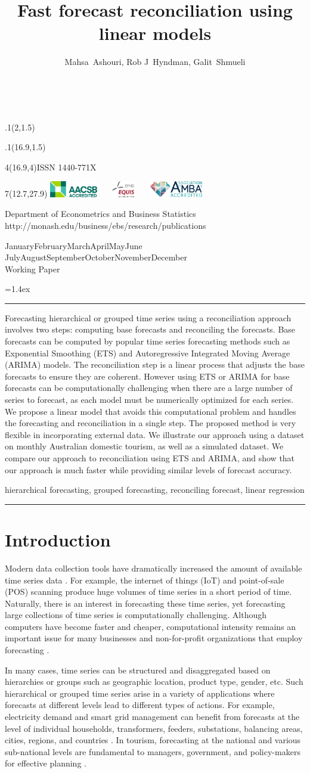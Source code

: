 \documentclass[11pt,a4paper,]{article}
\title{Fast forecast reconciliation using linear models}
\author{Mahsa~Ashouri, Rob J~Hyndman, Galit~Shmueli}
\date{\sf\Date~\Month~\Year}
\makeatletter
\def\Date{\number\day}
\def\Month{\ifcase\month\or
 January\or February\or March\or April\or May\or June\or
 July\or August\or September\or October\or November\or December\fi}
\def\Year{\number\year}
\def\showjel{{\large\textsf{\textbf{JEL classification:}}~\@jel}}
\def\cover{{\sffamily\setcounter{page}{0}
        \thispagestyle{empty}
        \placefig{2}{1.5}{width=5cm}{monash2}
        \placefig{16.9}{1.5}{width=2.1cm}{MBusSchool}
        \begin{textblock}{4}(16.9,4)ISSN 1440-771X\end{textblock}
        \begin{textblock}{7}(12.7,27.9)\hfill
        \includegraphics[height=0.7cm]{AACSB}~~~
        \includegraphics[height=0.7cm]{EQUIS}~~~
        \includegraphics[height=0.7cm]{AMBA}
        \end{textblock}
        \vspace*{2cm}
        \begin{center}\Large
        Department of Econometrics and Business Statistics\\[.5cm]
        \footnotesize http://monash.edu/business/ebs/research/publications
        \end{center}\vspace{2cm}
        \begin{center}
        \fbox{\parbox{14cm}{\begin{onehalfspace}\centering\Huge\vspace*{0.3cm}
                \textsf{\textbf{\expandafter{\@title}}}\vspace{1cm}\par
                \LARGE\@author\end{onehalfspace}
        }}
        \end{center}
        \vfill
                \begin{center}\Large
                \Month~\Year\\[1cm]
                Working Paper \@wp
        \end{center}\vspace*{2cm}}}
\def\pageone{{\sffamily\setstretch{1}%
        \thispagestyle{empty}%
        \vbox to \textheight{%
        \raggedright\baselineskip=1.2cm
     {\fontsize{24.88}{30}\sffamily\textbf{\expandafter{\@title}}}
        \vspace{2cm}\par
        \hspace{1cm}\parbox{14cm}{\sffamily\large\@addresses}\vspace{1cm}\vfill
        \hspace{1cm}{\large\Date~\Month~\Year}\\[1cm]
        \hspace{1cm}\showjel\vss}}}
\def\blindtitle{{\sffamily
     \thispagestyle{plain}\raggedright\baselineskip=1.2cm
     {\fontsize{24.88}{30}\sffamily\textbf{\expandafter{\@title}}}\vspace{1cm}\par
        }}
\def\titlepage{{\cover\newpage\pageone\newpage\blindtitle}}
\let\maketitle\titlepage
\newenvironment{keywords}{\par\vspace{0.5cm}\noindent{\sffamily\textbf{Keywords:}}}{\vspace{0.25cm}\par\hrule\vspace{0.5cm}\par}
\renewenvironment{abstract}{\begin{minipage}{\textwidth}\parskip=1.4ex\noindent
\hrule\vspace{0.1cm}\par{\sffamily\textbf{\abstractname}}\newline}
  {\end{minipage}}
\def\placefig#1#2#3#4{\begin{textblock}{.1}(#1,#2)\rlap{\texttt{[image: \#4]}}\end{textblock}}
\makeatother
\begin{document}
\maketitle
\begin{abstract}
Forecasting hierarchical or grouped time series using a reconciliation approach involves two steps: computing base forecasts and reconciling the forecasts. Base forecasts can be computed by popular time series forecasting methods such as Exponential Smoothing (ETS) and Autoregressive Integrated Moving Average (ARIMA) models. The reconciliation step is a linear process that adjusts the base forecasts to ensure they are coherent. However using ETS or ARIMA for base forecasts can be computationally challenging when there are a large number of series to forecast, as each model must be numerically optimized for each series. We propose a linear model that avoids this computational problem and handles the forecasting and reconciliation in a single step. The proposed method is very flexible in incorporating external data. We illustrate our approach using a dataset on monthly Australian domestic tourism, as well as a simulated dataset. We compare our approach to reconciliation using ETS and ARIMA, and show that our approach is much faster while providing similar levels of forecast accuracy.
\end{abstract}
\begin{keywords}
hierarchical forecasting, grouped forecasting, reconciling forecast, linear regression
\end{keywords}

\hypertarget{introduction}{%
\section{Introduction}\label{introduction}}

Modern data collection tools have dramatically increased the amount of available time series data \autocite{januschowski2013forecasting}. For example, the internet of things (IoT) and point-of-sale (POS) scanning produce huge volumes of time series in a short period of time. Naturally, there is an interest in forecasting these time series, yet forecasting large collections of time series is computationally challenging. Although computers have become faster and cheaper, computational intensity remains an important issue for many businesses and non-for-profit organizations that employ forecasting \autocite{makridakis2018statistical}.

In many cases, time series can be structured and disaggregated based on hierarchies or groups such as geographic location, product type, gender, etc. Such hierarchical or grouped time series arise in a variety of applications where forecasts at different levels lead to different types of actions. For example, electricity demand and smart grid management can benefit from forecasts at the level of individual households, transformers, feeders, substations, balancing areas, cities, regions, and countries \autocite{taieb2020hierarchical}. In tourism, forecasting at the national and various sub-national levels are fundamental to managers, government, and policy-makers for effective planning \autocite{makoni2021hierarchical}.
\end{document}
